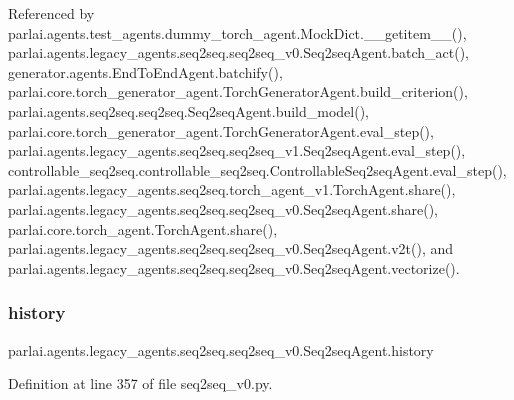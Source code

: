 Referenced by parlai.\+agents.\+test\+\_\+agents.\+dummy\+\_\+torch\+\_\+agent.\+Mock\+Dict.\+\_\+\+\_\+getitem\+\_\+\+\_\+(), parlai.\+agents.\+legacy\+\_\+agents.\+seq2seq.\+seq2seq\+\_\+v0.\+Seq2seq\+Agent.\+batch\+\_\+act(), generator.\+agents.\+End\+To\+End\+Agent.\+batchify(), parlai.\+core.\+torch\+\_\+generator\+\_\+agent.\+Torch\+Generator\+Agent.\+build\+\_\+criterion(), parlai.\+agents.\+seq2seq.\+seq2seq.\+Seq2seq\+Agent.\+build\+\_\+model(), parlai.\+core.\+torch\+\_\+generator\+\_\+agent.\+Torch\+Generator\+Agent.\+eval\+\_\+step(), parlai.\+agents.\+legacy\+\_\+agents.\+seq2seq.\+seq2seq\+\_\+v1.\+Seq2seq\+Agent.\+eval\+\_\+step(), controllable\+\_\+seq2seq.\+controllable\+\_\+seq2seq.\+Controllable\+Seq2seq\+Agent.\+eval\+\_\+step(), parlai.\+agents.\+legacy\+\_\+agents.\+seq2seq.\+torch\+\_\+agent\+\_\+v1.\+Torch\+Agent.\+share(), parlai.\+agents.\+legacy\+\_\+agents.\+seq2seq.\+seq2seq\+\_\+v0.\+Seq2seq\+Agent.\+share(), parlai.\+core.\+torch\+\_\+agent.\+Torch\+Agent.\+share(), parlai.\+agents.\+legacy\+\_\+agents.\+seq2seq.\+seq2seq\+\_\+v0.\+Seq2seq\+Agent.\+v2t(), and parlai.\+agents.\+legacy\+\_\+agents.\+seq2seq.\+seq2seq\+\_\+v0.\+Seq2seq\+Agent.\+vectorize().

\mbox{\label{classparlai_1_1agents_1_1legacy__agents_1_1seq2seq_1_1seq2seq__v0_1_1Seq2seqAgent_a11398edabc596559f45324d2d603b1e3}} 
\subsubsection{\texorpdfstring{history}{history}}
{\footnotesize\ttfamily parlai.\+agents.\+legacy\+\_\+agents.\+seq2seq.\+seq2seq\+\_\+v0.\+Seq2seq\+Agent.\+history}



Definition at line 357 of file seq2seq\+\_\+v0.\+py.



